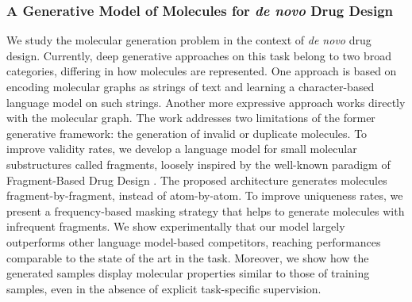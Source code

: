 \subsubsection*{A Generative Model of Molecules for \emph{de novo} Drug Design}
We study the molecular generation problem in the context of \emph{de novo} drug design. Currently, deep generative approaches on this task belong to two broad categories, differing in how molecules are represented. One approach is based on encoding molecular graphs as strings of text and learning a character-based language model on such strings. Another more expressive approach works directly with the molecular graph. The work addresses two limitations of the former generative framework: the generation of invalid or duplicate molecules. To improve validity rates, we develop a language model for small molecular substructures called fragments, loosely inspired by the well-known paradigm of Fragment-Based Drug Design \citep{erlanson2004fbdd}. The proposed architecture generates molecules fragment-by-fragment, instead of atom-by-atom. To improve uniqueness rates, we present a frequency-based masking strategy that helps to generate molecules with infrequent fragments. We show experimentally that our model largely outperforms other language model-based competitors, reaching performances comparable to the state of the art in the task. Moreover, we show how the generated samples display molecular properties similar to those of training samples, even in the absence of explicit task-specific supervision.

